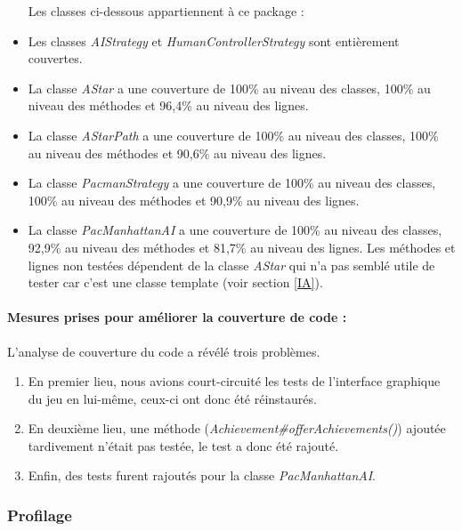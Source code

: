 \documentclass[12pt, openany]{report}
\begin{document}
\begin{itemize}
Les classes ci-dessous appartiennent à ce package :\\ 
	\item Les classes \mbox{\textit{AIStrategy}} et \mbox{\textit{HumanControllerStrategy}} sont entièrement couvertes.
	\item La classe \mbox{\textit{AStar}} a une couverture de 100\% au niveau des classes, 100\% au niveau des méthodes et 96,4\% au niveau des lignes.
	\item La classe \mbox{\textit{AStarPath}} a une couverture de 100\% au niveau des classes, 100\% au niveau des méthodes et 90,6\% au niveau des lignes.
	\item La classe \mbox{\textit{PacmanStrategy}} a une couverture de 100\% au niveau des classes, 100\% au niveau des méthodes et 90,9\% au niveau des lignes.
	\item La classe \mbox{\textit{PacManhattanAI}} a une couverture de 100\% au niveau des classes, 92,9\% au niveau des méthodes et 81,7\% au niveau des lignes. Les méthodes et lignes non testées dépendent de la classe \textit{AStar} qui n'a pas semblé utile de tester car c'est une classe template (voir section \ref{IA}).
\end{itemize}


\paragraph{Mesures prises pour améliorer la couverture de code : }
L'analyse de couverture du code a révélé trois problèmes.

\begin{enumerate}
\item En premier lieu, nous avions \og court-circuité \fg \space les tests de l'interface graphique du jeu en lui-même, ceux-ci ont donc été réinstaurés.

\item En deuxième lieu, une méthode (\mbox{\textit{Achievement\#offerAchievements()}}) ajoutée tardivement n'était pas testée, le test a donc été rajouté.

\item Enfin, des tests furent rajoutés pour la classe \mbox{\textit{PacManhattanAI}}.
\end{enumerate}



\subsubsection{Profilage}
\end{document}

